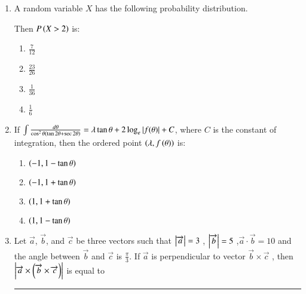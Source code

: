\documentclass[journal,12pt,onecolumn]{IEEEtran}
\theoremstyle{remark}
\begin{document}
\begin{enumerate}
    \item A random variable $X$ has the following probability distribution.
    \begin{table}[h!]    
        \centering
        
    \end{table}
    Then $P\left(X>2\right)$ is:
    \begin{multicols}{2}
    \begin{enumerate}
        \item $\frac{7}{12}$\\
        \item $\frac{23}{26}$
        \item $\frac{1}{36}$\\
        \item $\frac{1}{6}$\\
    \end{enumerate}
    \end{multicols}

    \item If $\int \frac{d\theta}{\cos^2 \theta (\tan 2\theta + \sec 2 \theta)} = \lambda \tan \theta + 2 \log_e \left\vert f(\theta)\right\vert  + C$, where $C$ is the constant of integration, then the ordered point $\left(\lambda, f\left(\theta\right)\right)$ is:
    \begin{multicols}{2}
    \begin{enumerate}
        \item $\left(-1, 1-\tan \theta\right)$\\
        \item $\left(-1, 1+\tan \theta\right)$\\
        \item $\left(1, 1+\tan \theta\right)$\\
        \item $\left(1, 1-\tan \theta\right)$
    \end{enumerate}
    \end{multicols}

    \item Let $\Vec{a}$, $\vec{b}$, and $\vec{c}$ be three vectors such that $\left\vert\overrightarrow a\right\vert=3$ , $\left\vert\overrightarrow b\right\vert=5$ ,$\overrightarrow{a}\cdot \overrightarrow{b}= 10$ and the angle between $\overrightarrow{b}$ and $\overrightarrow{c}$ is $\frac{\pi}{3}$. If $\overrightarrow{a}$ is perpendicular to vector $\overrightarrow{b} \times \overrightarrow{c}$ ,  then $\left\vert\overrightarrow{a} \times \left(\overrightarrow{b}\times \overrightarrow{c}\right)\right\vert$ is equal to \rule{1cm}{0.15mm}\\


\end{enumerate}
\end{document}
